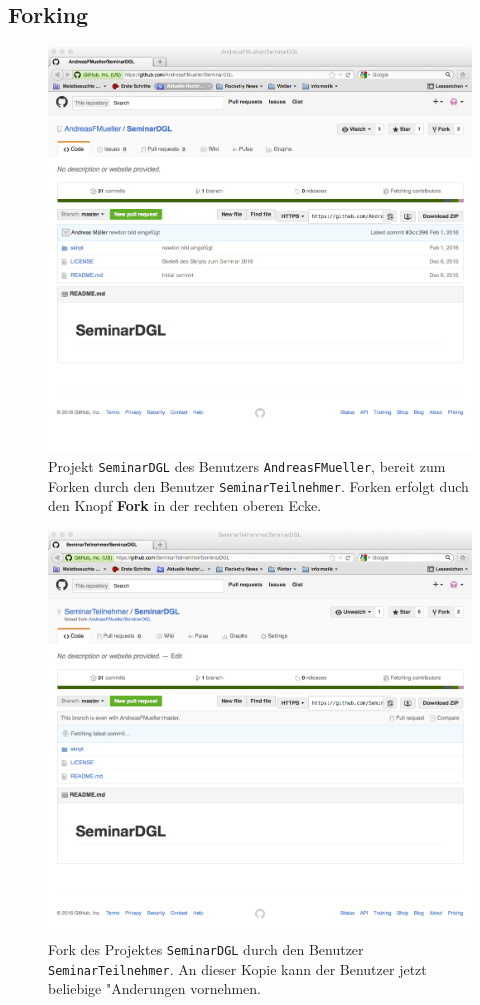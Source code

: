 \documentclass[a4paper,12pt]{article}
\begin{document}
\subsection{Forking}
\begin{figure}
\centering
\includegraphics[width=\hsize]{fork.png}
\caption{Projekt \texttt{SeminarDGL} des Benutzers \texttt{AndreasFMueller},
bereit zum Forken durch den Benutzer \texttt{SeminarTeilnehmer}.
Forken erfolgt duch den Knopf {\bf Fork} in der rechten oberen Ecke.
\label{fork}}
\end{figure}
\begin{figure}
\centering
\includegraphics[width=\hsize]{forked.png}
\caption{Fork des Projektes \texttt{SeminarDGL} durch den Benutzer
\texttt{SeminarTeilnehmer}.
An dieser Kopie kann der Benutzer jetzt beliebige "Anderungen vornehmen.
\label{forked}}
\end{figure}
\end{document}

